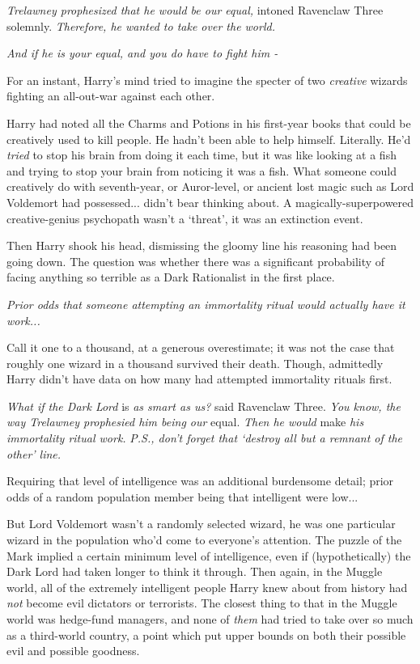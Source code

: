 \emph{Trelawney prophesized that he would be our equal,} intoned
Ravenclaw Three solemnly. \emph{Therefore, he wanted to take over the
world.}

\emph{And if he is your equal, and you do have to fight him -}

For an instant, Harry's mind tried to imagine the specter of two
\emph{creative} wizards fighting an all-out-war against each other.

Harry had noted all the Charms and Potions in his first-year books that
could be creatively used to kill people. He hadn't been able to help
himself. Literally. He'd \emph{tried} to stop his brain from doing it
each time, but it was like looking at a fish and trying to stop your
brain from noticing it was a fish. What someone could creatively do with
seventh-year, or Auror-level, or ancient lost magic such as Lord
Voldemort had possessed... didn't bear thinking about. A
magically-superpowered creative-genius psychopath wasn't a `threat', it
was an extinction event.

Then Harry shook his head, dismissing the gloomy line his reasoning had
been going down. The question was whether there was a significant
probability of facing anything so terrible as a Dark Rationalist in the
first place.

\emph{Prior odds that someone attempting an immortality ritual would
actually have it work...}

Call it one to a thousand, at a generous overestimate; it was not the
case that roughly one wizard in a thousand survived their death. Though,
admittedly Harry didn't have data on how many had attempted immortality
rituals first.

\emph{What if the Dark Lord} is \emph{as smart as us?} said Ravenclaw
Three. \emph{You know, the way Trelawney prophesied him being our}
equal. \emph{Then he would} make \emph{his immortality ritual work.}
\emph{P.S., don't forget that `destroy all but a remnant of the other'
line.}

Requiring that level of intelligence was an additional burdensome
detail; prior odds of a random population member being that intelligent
were low...

But Lord Voldemort wasn't a randomly selected wizard, he was one
particular wizard in the population who'd come to everyone's attention.
The puzzle of the Mark implied a certain minimum level of intelligence,
even if (hypothetically) the Dark Lord had taken longer to think it
through. Then again, in the Muggle world, all of the extremely
intelligent people Harry knew about from history had \emph{not} become
evil dictators or terrorists. The closest thing to that in the Muggle
world was hedge-fund managers, and none of \emph{them} had tried to take
over so much as a third-world country, a point which put upper bounds on
both their possible evil and possible goodness.

